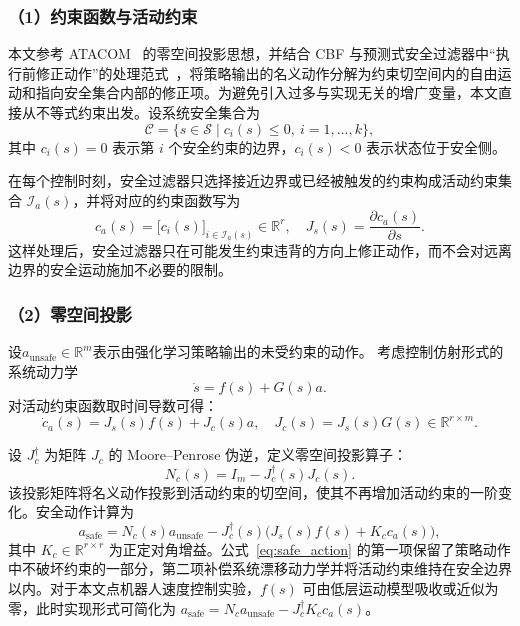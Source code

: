\subsubsection{（1）约束函数与活动约束}
本文参考 ATACOM~\cite{liu2022atacom,liu2023safe_manipulation} 的零空间投影思想，并结合 CBF 与预测式安全过滤器中“执行前修正动作”的处理范式~\cite{ames2017cbf_qp,wabersich2021predictive_safety_filter}，将策略输出的名义动作分解为约束切空间内的自由运动和指向安全集合内部的修正项。为避免引入过多与实现无关的增广变量，本文直接从不等式约束出发。设系统安全集合为
\begin{equation}
    \mathcal{C}=\{s\in\mathcal{S}\mid c_i(s)\leq 0,\ i=1,\ldots,k\},
    \label{eq:safe_set}
\end{equation}
其中 $c_i(s)=0$ 表示第 $i$ 个安全约束的边界，$c_i(s)<0$ 表示状态位于安全侧。

在每个控制时刻，安全过滤器只选择接近边界或已经被触发的约束构成活动约束集合 $\mathcal{I}_a(s)$，并将对应的约束函数写为
\begin{equation}
    c_a(s)=\bigl[c_i(s)\bigr]_{i\in\mathcal{I}_a(s)}\in\mathbb{R}^{r},
    \quad
    J_s(s)=\frac{\partial c_a(s)}{\partial s}.
    \label{eq:active_constraints}
\end{equation}
这样处理后，安全过滤器只在可能发生约束违背的方向上修正动作，而不会对远离边界的安全运动施加不必要的限制。

\subsubsection{（2）零空间投影}
设$a_{\text{unsafe}} \in \mathbb{R}^m$表示由强化学习策略输出的未受约束的动作。
考虑控制仿射形式的系统动力学
\[
    \dot{s}=f(s)+G(s)a .
\]
对活动约束函数取时间导数可得：
\begin{equation}
    \dot{c}_a(s)=J_s(s)f(s)+J_c(s)a,
    \quad
    J_c(s)=J_s(s)G(s)\in\mathbb{R}^{r\times m}.
    \label{eq:constraint_deriv}
\end{equation}

设 $J_c^\dagger$ 为矩阵 $J_c$ 的 Moore--Penrose 伪逆，定义零空间投影算子：
\begin{equation}
    N_c(s)=I_m-J_c^\dagger(s)J_c(s).
\end{equation}
该投影矩阵将名义动作投影到活动约束的切空间，使其不再增加活动约束的一阶变化。安全动作计算为
\begin{equation}
    a_{\text{safe}}
    =
    N_c(s)a_{\text{unsafe}}
    -
    J_c^\dagger(s)
    \bigl(J_s(s)f(s)+K_c c_a(s)\bigr),
    \label{eq:safe_action}
\end{equation}
其中 $K_c\in\mathbb{R}^{r\times r}$ 为正定对角增益。公式~\eqref{eq:safe_action} 的第一项保留了策略动作中不破坏约束的一部分，第二项补偿系统漂移动力学并将活动约束维持在安全边界以内。对于本文点机器人速度控制实验，$f(s)$ 可由低层运动模型吸收或近似为零，此时实现形式可简化为 $a_{\text{safe}}=N_c a_{\text{unsafe}}-J_c^\dagger K_c c_a(s)$。


